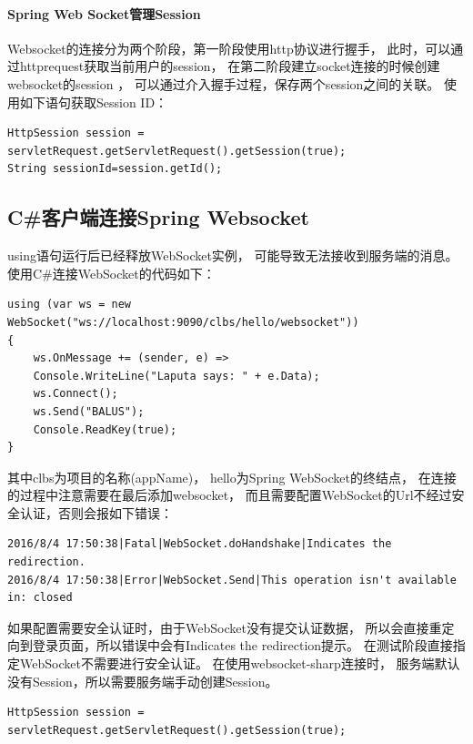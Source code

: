 \documentclass{book}
\begin{document}
\paragraph{Spring Web Socket管理Session}

Websocket的连接分为两个阶段，第一阶段使用http协议进行握手，
此时，可以通过httprequest获取当前用户的session，
在第二阶段建立socket连接的时候创建websocket的session ，
可以通过介入握手过程，保存两个session之间的关联。
使用如下语句获取Session ID：

\begin{lstlisting}[language={[Sharp]C}]
HttpSession session = servletRequest.getServletRequest().getSession(true);
String sessionId=session.getId();
\end{lstlisting}

\subsection{C\#客户端连接Spring Websocket}

using语句运行后已经释放WebSocket实例，
可能导致无法接收到服务端的消息。
使用C\#连接WebSocket的代码如下：

\begin{lstlisting}[language={[Sharp]C}]
using (var ws = new WebSocket("ws://localhost:9090/clbs/hello/websocket"))
{
	ws.OnMessage += (sender, e) =>
	Console.WriteLine("Laputa says: " + e.Data);
	ws.Connect();
	ws.Send("BALUS");
	Console.ReadKey(true);
}
\end{lstlisting}

其中clbs为项目的名称(appName)，
hello为Spring WebSocket的终结点，
在连接的过程中注意需要在最后添加websocket，
而且需要配置WebSocket的Url不经过安全认证，否则会报如下错误：

\begin{lstlisting}[language={[Sharp]C}]
2016/8/4 17:50:38|Fatal|WebSocket.doHandshake|Indicates the redirection.
2016/8/4 17:50:38|Error|WebSocket.Send|This operation isn't available in: closed
\end{lstlisting}

如果配置需要安全认证时，由于WebSocket没有提交认证数据，
所以会直接重定向到登录页面，所以错误中会有Indicates the redirection提示。
在测试阶段直接指定WebSocket不需要进行安全认证。
在使用websocket-sharp连接时，
服务端默认没有Session，所以需要服务端手动创建Session。

\begin{lstlisting}[language={[Sharp]C}]
HttpSession session = servletRequest.getServletRequest().getSession(true);
\end{lstlisting}
\end{document}
